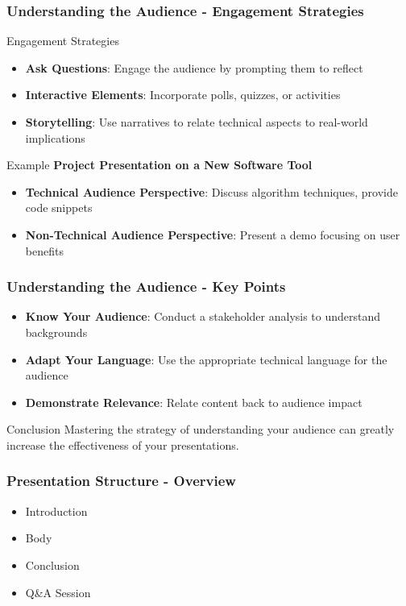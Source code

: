 \documentclass{beamer}
\begin{document}
\begin{frame}[fragile]
    \frametitle{Understanding the Audience - Engagement Strategies}
    \begin{block}{Engagement Strategies}
        \begin{itemize}
            \item \textbf{Ask Questions}: Engage the audience by prompting them to reflect
            \item \textbf{Interactive Elements}: Incorporate polls, quizzes, or activities
            \item \textbf{Storytelling}: Use narratives to relate technical aspects to real-world implications
        \end{itemize}
    \end{block}

    \begin{block}{Example}
        \textbf{Project Presentation on a New Software Tool}
        \begin{itemize}
            \item \textbf{Technical Audience Perspective}: Discuss algorithm techniques, provide code snippets
            \item \textbf{Non-Technical Audience Perspective}: Present a demo focusing on user benefits
        \end{itemize}
    \end{block}
\end{frame}

\begin{frame}[fragile]
    \frametitle{Understanding the Audience - Key Points}
    \begin{itemize}
        \item \textbf{Know Your Audience}: Conduct a stakeholder analysis to understand backgrounds
        \item \textbf{Adapt Your Language}: Use the appropriate technical language for the audience
        \item \textbf{Demonstrate Relevance}: Relate content back to audience impact
    \end{itemize}

    \begin{block}{Conclusion}
        Mastering the strategy of understanding your audience can greatly increase the effectiveness of your presentations.
    \end{block}
\end{frame}

\begin{frame}[fragile]
    \frametitle{Presentation Structure - Overview}
    \begin{itemize}
        \item Introduction
        \item Body
        \item Conclusion
        \item Q\&A Session
    \end{itemize}
\end{frame}
\end{document}
